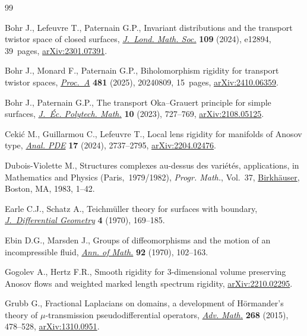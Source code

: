 \begin{thebibliography}{99}
\footnotesize\itemsep=0pt

Bohr J., Lefeuvre T., Paternain G.P., Invariant distributions and the transport
 twistor space of closed surfaces,
 \href{https://doi.org/10.1112/jlms.12894}{\textit{J.~Lond. Math. Soc.}}
 \textbf{109} (2024), e12894, 39~pages,
 \href{http://arxiv.org/abs/2301.07391}{arXiv:2301.07391}.

Bohr J., Monard F., Paternain G.P., Biholomorphism rigidity for transport
 twistor spaces,
 \href{https://doi.org/10.1098/rspa.2024.0809}{\textit{Proc.~A}} \textbf{481}
 (2025), 20240809, 15~pages,
 \href{http://arxiv.org/abs/2410.06359}{arXiv:2410.06359}.

Bohr J., Paternain G.P., The transport {O}ka--{G}rauert principle for simple
 surfaces, \href{https://doi.org/10.5802/jep.231}{\textit{J.~\'{E}c. Polytech.
 Math.}} \textbf{10} (2023), 727--769,
 \href{http://arxiv.org/abs/2108.05125}{arXiv:2108.05125}.

Ceki\'c M., Guillarmou C., Lefeuvre T., Local lens rigidity for manifolds of
 {A}nosov type, \href{https://doi.org/10.2140/apde.2024.17.2737}{\textit{Anal.
 PDE}} \textbf{17} (2024), 2737--2795,
 \href{http://arxiv.org/abs/2204.02476}{arXiv:2204.02476}.

Dubois-Violette M., Structures complexes au-dessus des vari\'et\'es,
 applications, in Mathematics and {P}hysics ({P}aris,~1979/1982),
 \textit{Progr. Math.}, Vol.~37,
 \href{https://doi.org/10.1007/BF02591680}{Birkh\"auser}, Boston, MA, 1983,
 1--42.

Earle C.J., Schatz A., Teichm\"uller theory for surfaces with boundary,
 \href{https://doi.org/10.4310/jdg/1214429381}{\textit{J.~Differential
 Geometry}} \textbf{4} (1970), 169--185.

Ebin D.G., Marsden J., Groups of diffeomorphisms and the motion of an
 incompressible fluid, \href{https://doi.org/10.2307/1970699}{\textit{Ann. of
 Math.}} \textbf{92} (1970), 102--163.

Gogolev A., Hertz F.R., Smooth rigidity for 3-dimensional volume preserving
 {A}nosov flows and weighted marked length spectrum rigidity,
 \href{http://arxiv.org/abs/2210.02295}{arXiv:2210.02295}.

Grubb G., Fractional {L}aplacians on domains, a development of {H}\"ormander's
 theory of {$\mu$}-transmission pseudodifferential operators,
 \href{https://doi.org/10.1016/j.aim.2014.09.018}{\textit{Adv. Math.}}
 \textbf{268} (2015), 478--528,
 \href{http://arxiv.org/abs/1310.0951}{arXiv:1310.0951}.


\end{thebibliography}
